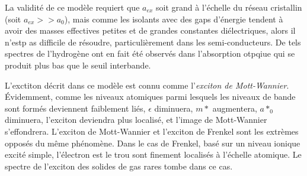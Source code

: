 La validité de ce modèle requiert que $a_{ex}$ soit grand à l'échelle du réseau cristallin (soit $a_{ex} >> a_0$), mais comme les isolants avec des gaps d'énergie tendent à avoir des masses effectives petites et de grandes constantes diélectriques, alors il n'estp as difficile de résoudre, particulièrement dans les semi-conducteurs. De tels spectres de l'hydrogène ont en fait été observés dans l'absorption otpqiue qui se produit plus bas que le seuil interbande.

L'exctiton décrit dans ce modèle est connu comme l'\emph{exciton de Mott-Wannier}. Évidemment, comme les niveaux atomiques parmi lesquels les niveaux de bande sont formés deviennent faiblement liés, $\epsilon$ diminuera, $m*$ augmentera, $a*_0$ diminuera, l'exciton deviendra plus localisé, et l'image de Mott-Wannier s'effondrera. L'exciton de Mott-Wannier et l'exciton de Frenkel sont les extrèmes opposés du même phénomène. Dans le cas de Frenkel, basé sur un niveau ionique excité simple, l'électron est le trou sont finement localisés à l'échelle atomique. Le spectre de l'exciton des solides de gas rares tombe dans ce cas.
